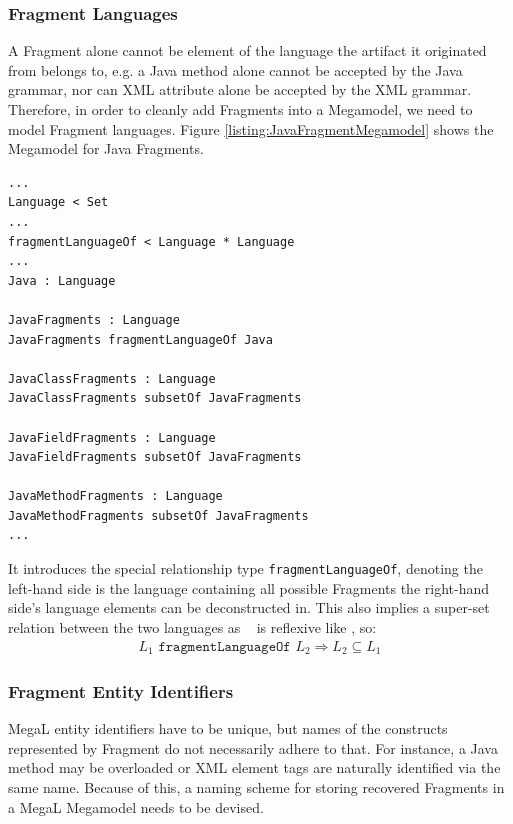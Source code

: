 \subsubsection{Fragment Languages}
\label{subsubsection:FragmentLanguages}
A \gls{Fragment} alone cannot be element of the language the artifact it originated from belongs to, e.g. a \gls{Java} method alone cannot be accepted by the \gls{Java} grammar, nor can \gls{XML} attribute alone be accepted by the \gls{XML} grammar.
Therefore, in order to cleanly add \glspl{Fragment} into a \gls{Megamodel}, we need to model \gls{Fragment} languages.
Figure \ref{listing:JavaFragmentMegamodel} shows the \gls{Megamodel} for \gls{Java} \glspl{Fragment}.
\begin{lstlisting}[caption={A Megamodel for Java Fragment},label={listing:JavaFragmentMegamodel}]
...
Language < Set
...
fragmentLanguageOf < Language * Language
...
Java : Language

JavaFragments : Language
JavaFragments fragmentLanguageOf Java

JavaClassFragments : Language
JavaClassFragments subsetOf JavaFragments

JavaFieldFragments : Language
JavaFieldFragments subsetOf JavaFragments

JavaMethodFragments : Language
JavaMethodFragments subsetOf JavaFragments
...
\end{lstlisting}
It introduces the special relationship type \texttt{fragmentLanguageOf}, denoting the left-hand side is the language containing all possible \glspl{Fragment}  the right-hand side's language elements can be deconstructed in.
This also implies a super-set relation between the two languages as \fragmentOf~ is reflexive like \partOf, so:
\begin{align*}
L_1 \texttt{~fragmentLanguageOf~} L_2 \Rightarrow L_2 \subseteq L_1
\end{align*}

\subsubsection{Fragment Entity Identifiers}
\label{subsubsection:FragmentEntityIdentifiers}
\gls{MegaL} entity identifiers have to be unique, but names of the constructs represented by \gls{Fragment} do not necessarily adhere to that.
For instance, a \gls{Java} method may be overloaded or \gls{XML} element tags are naturally identified via the same name.
Because of this, a naming scheme for storing recovered \glspl{Fragment} in a \gls{MegaL} \gls{Megamodel} needs to be devised.

